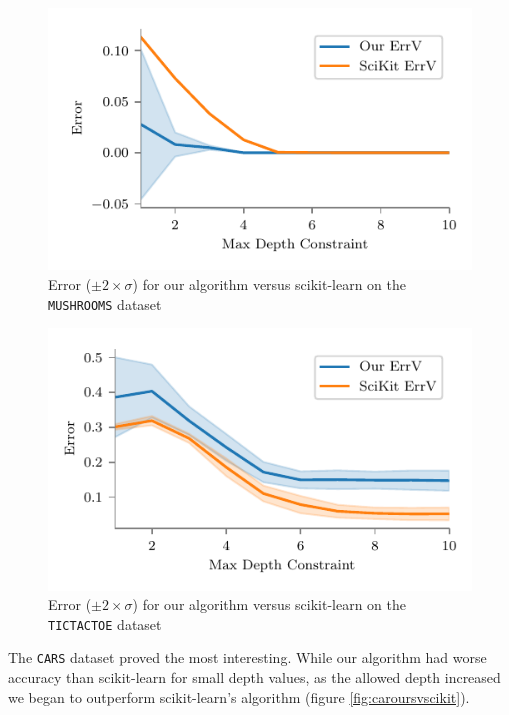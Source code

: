 \documentclass[screen, authorversion, nonacm, sigconf]{acmart}
\begin{document}
\begin{figure}
  \centering
  \includegraphics[width=\columnwidth]{figures/chart_ours_v_scikit_variance_mushrooms.pdf}
  \caption{Error ($\pm 2 \times \sigma$) for our algorithm versus scikit-learn on the \texttt{MUSHROOMS} dataset}
  \label{fig:mushoursvscikit}
\end{figure}

\begin{figure}
  \centering
  \includegraphics[width=\columnwidth]{figures/chart_ours_v_scikit_variance_tictactoe.pdf}
  \caption{Error ($\pm 2 \times \sigma$) for our algorithm versus scikit-learn on the \texttt{TICTACTOE} dataset}
  \label{fig:tttoursvscikit}
\end{figure}

The \texttt{CARS} dataset proved the most interesting. While our algorithm had worse accuracy than scikit-learn for small depth values, as the allowed depth increased we began to outperform scikit-learn's algorithm (figure \ref{fig:caroursvscikit}).
\end{document}
